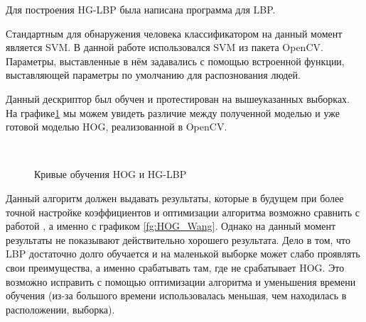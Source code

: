 \documentclass[12pt,twoside]{article}
\begin{document}
Для построения HG-LBP была написана программа для LBP.

Стандартным для обнаружения человека классификатором на данный момент является SVM. В данной работе использовался SVM из пакета OpenCV\cite{opencv}. Параметры, выставленные в нём задавались с помощью встроенной функции, выставляющей параметры по умолчанию для распознования людей.

Данный дескриптор был обучен и протестирован на вышеуказанных выборках. На графике\ref{fg:Results_1} мы можем увидеть различие между полученной моделью и уже готовой моделью HOG, реализованной в OpenCV.

\begin{figure}[h]
  \\
\caption{Кривые обучения HOG и HG-LBP}
\label{fg:Results_1}
\end{figure}

Данный алгоритм должен выдавать результаты, которые в будущем при более точной настройке коэффициентов и оптимизации алгоритма возможно сравнить с работой \cite{Wang09}, а именно с графиком \ref{fg:HOG_Wang}. Однако на данный момент результаты не показывают действительно хорошего результата. Дело в том, что LBP достаточно долго обучается и на маленькой выборке может слабо проявлять свои преимущества, а именно срабатывать там, где не срабатывает HOG. Это возможно исправить с помощью оптимизации алгоритма и уменьшения времени обучения (из-за большого времени использовалась меньшая, чем находилась в расположении, выборка).
\end{document}

